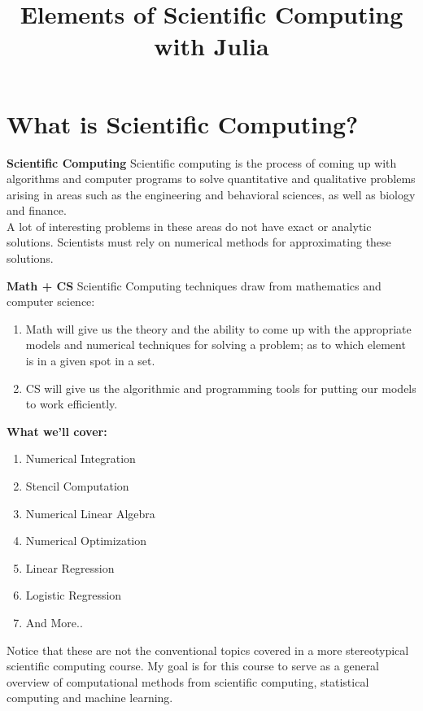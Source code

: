 \documentclass[xcolor=dvipsnames]{beamer}
\title[Scientific Computing]{Elements of Scientific Computing with Julia}
\begin{document}
\begin{frame}
\titlepage
\end{frame}

\section{What is Scientific Computing?}
\begin{frame}[fragile]
{\bf Scientific Computing}
Scientific computing is the process of coming up with algorithms and computer programs to solve quantitative and qualitative problems arising in areas such as the engineering and behavioral sciences, as well as biology and finance.\\ 
\vfill
\pause
A lot of interesting problems in these areas do not have exact or analytic solutions. Scientists must rely on numerical methods for approximating these solutions.\\
\end{frame}

\begin{frame}[fragile]
{\bf Math + CS}
Scientific Computing techniques draw from mathematics and computer science:
\begin{enumerate}
\item Math will give us the theory and the ability to come up with the appropriate models and numerical techniques for solving a problem; as to which element is in a given spot in a set.
\item CS will give us the algorithmic and programming tools for putting our models to work efficiently.
\end{enumerate}
\end{frame}

\begin{frame}
{\bf What we'll cover:}
\begin{enumerate}
\item Numerical Integration
\item Stencil Computation
\item Numerical Linear Algebra
\item Numerical Optimization
\item Linear Regression
\item Logistic Regression
\item And More..
\end{enumerate}
\vfill
\pause
Notice that these are not the conventional topics covered in a more stereotypical scientific computing course. My goal is for this course to serve as a general overview of computational methods from scientific computing, statistical computing and machine learning.
\end{frame}
\end{document}
